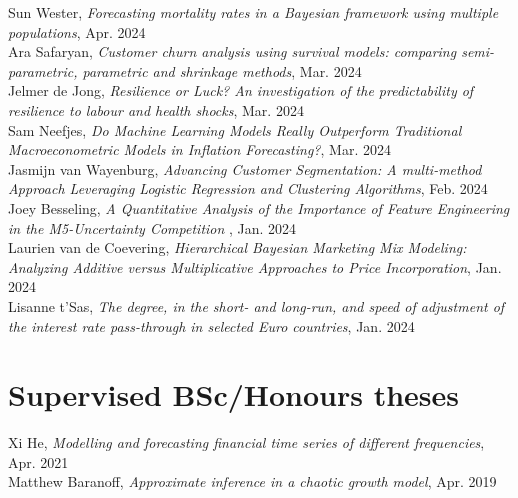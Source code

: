 \documentclass[margin,line]{resume}
\begin{document}
\begin{resume}
Sun Wester, \textit{Forecasting mortality rates in a Bayesian framework using multiple populations}, Apr. 2024	\vspace{2mm}\\
Ara Safaryan, \textit{Customer churn analysis using survival models: comparing semi-parametric, parametric and shrinkage methods},	Mar. 2024	\vspace{2mm}\\
Jelmer de Jong, \textit{Resilience or Luck? An investigation of the predictability of resilience to labour and health shocks},	Mar. 2024 \vspace{2mm}\\
Sam Neefjes, \textit{Do Machine Learning Models Really Outperform Traditional Macroeconometric Models in Inflation Forecasting?},	Mar. 2024 \vspace{2mm}\\


\newpage	
\vspace{-5mm}
Jasmijn van Wayenburg, \textit{Advancing Customer Segmentation: A multi-method Approach Leveraging Logistic Regression and Clustering Algorithms},	Feb. 2024 \vspace{2mm}\\
Joey Besseling, \textit{A Quantitative Analysis of the Importance of Feature Engineering in the M5-Uncertainty Competition	},	Jan. 2024	 \vspace{2mm}\\
Laurien van de Coevering, \textit{Hierarchical Bayesian Marketing Mix Modeling: Analyzing Additive versus Multiplicative Approaches to Price Incorporation},	Jan. 2024 \vspace{2mm}\\
Lisanne t’Sas, \textit{The degree, in the short- and long-run, and speed of adjustment of the interest rate pass-through in selected Euro countries},	Jan. 2024 \vspace{2mm}\\


\vspace{-5mm}     

\section{\mysidestyle Supervised BSc/Honours theses} 
Xi He, \textit{Modelling and forecasting financial time series of different frequencies}, Apr. 2021\vspace{2mm}\\
Matthew Baranoff, \textit{Approximate inference in a chaotic growth model}, Apr. 2019 \vspace{2mm}\\


\end{resume}
\end{document}
